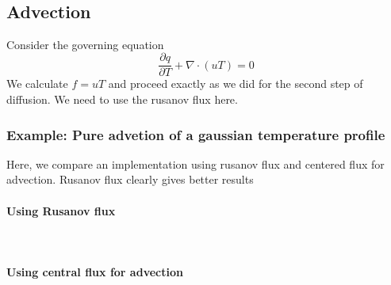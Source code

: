 \documentclass[11pt]{article}
\begin{document}
    \begin{center}
    \end{center}
    { \hspace*{\fill} \\}
    
    \subsection{Advection}\label{advection}

Consider the governing equation
\[\frac{\partial q}{\partial T} + \nabla \cdot (uT) = 0\] We calculate
\(f = uT\) and proceed exactly as we did for the second step of
diffusion. We need to use the rusanov flux here.

\subsubsection{Example: Pure advetion of a gaussian temperature
profile}\label{example-pure-advetion-of-a-gaussian-temperature-profile}

Here, we compare an implementation using rusanov flux and centered flux
for advection. Rusanov flux clearly gives better results

\paragraph{Using Rusanov flux}\label{using-rusanov-flux}




    \begin{center}
    \end{center}
    { \hspace*{\fill} \\}
    
    \paragraph{Using central flux for
advection}\label{using-central-flux-for-advection}


    \begin{center}
    \end{center}
    { \hspace*{\fill} \\}
    
\end{document}
